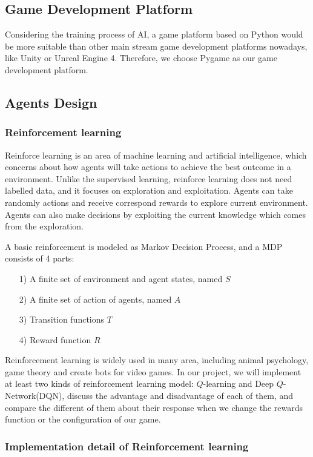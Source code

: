 \documentclass[14pt]{extarticle}
\begin{document}
\subsection{Game Development Platform}
Considering the training process of AI, a game platform based on Python would be more suitable than other main stream game development platforms nowadays, like Unity or Unreal Engine 4. Therefore, we choose Pygame as our game development platform.

\subsection{Agents Design}
\subsubsection{Reinforcement learning}

Reinforce learning is an area of machine learning and artificial intelligence, which concerns about how agents will take actions to achieve the best outcome in a environment. Unlike the supervised learning, reinforce learning does not need labelled data, and it focuses on exploration and exploitation. Agents can take randomly actions and receive correspond rewards to explore current environment. Agents can also make decisions by exploiting the current knowledge which comes from the exploration.

A basic reinforcement is modeled as Markov Decision Process, and a MDP consists of 4 parts:
\begin{itemize}
    \item [1)] A finite set of environment and agent states, named $S$
    \item [2)] A finite set of action of agents, named $A$
    \item [3)] Transition functions $T$
    \item [4)] Reward function $R$
\end{itemize}
Reinforcement learning is widely used in many area, including animal psychology, game theory and create bots for video games. In our project, we will implement at least two kinds of reinforcement learning  model: $Q$-learning and Deep $Q$-Network(DQN), discuss the advantage and disadvantage of each of them, and compare the different of them about their response when we change the rewards function or the configuration of our game.

\subsubsection*{\small Implementation detail of Reinforcement learning}
\end{document}
